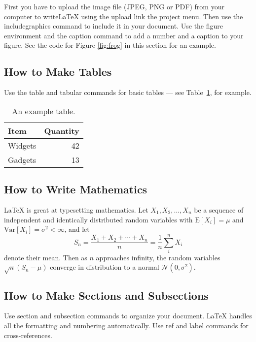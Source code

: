 \documentclass[a4paper]{article}
\begin{document}
First you have to upload the image file (JPEG, PNG or PDF) from your computer to writeLaTeX using the upload link the project menu. Then use the includegraphics command to include it in your document. Use the figure environment and the caption command to add a number and a caption to your figure. See the code for Figure \ref{fig:frog} in this section for an example.


\subsection{How to Make Tables}

Use the table and tabular commands for basic tables --- see Table~\ref{tab:widgets}, for example.

\begin{table}
\centering
\begin{tabular}{l|r}
Item & Quantity \\\hline
Widgets & 42 \\
Gadgets & 13
\end{tabular}
\caption{\label{tab:widgets}An example table.}
\end{table}

\subsection{How to Write Mathematics}

\LaTeX{} is great at typesetting mathematics. Let $X_1, X_2, \ldots, X_n$ be a sequence of independent and identically distributed random variables with $\text{E}[X_i] = \mu$ and $\text{Var}[X_i] = \sigma^2 < \infty$, and let
$$S_n = \frac{X_1 + X_2 + \cdots + X_n}{n}
      = \frac{1}{n}\sum_{i}^{n} X_i$$
denote their mean. Then as $n$ approaches infinity, the random variables $\sqrt{n}(S_n - \mu)$ converge in distribution to a normal $\mathcal{N}(0, \sigma^2)$.

\subsection{How to Make Sections and Subsections}

Use section and subsection commands to organize your document. \LaTeX{} handles all the formatting and numbering automatically. Use ref and label commands for cross-references.
\end{document}
